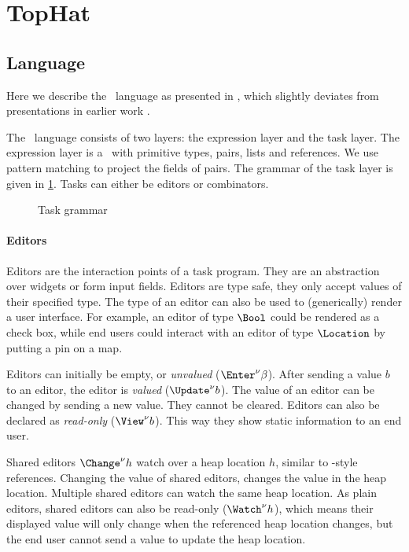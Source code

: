 
\section{TopHat}
\label{sec:tophat}

\subsection{Language}

Here we describe the \TOPHAT\ language as presented in \citet{Steenvoorden22},
which slightly deviates from presentations in earlier work \cite{conf/ppdp/SteenvoordenNK19,conf/ifl/NausSK19,conf/sfp/NausS20}.

The \TOPHAT\ language consists of two layers: the expression layer and the task layer.
The expression layer is a \STLC\ with primitive types, pairs, lists and references.
We use pattern matching to project the fields of pairs.
%
The grammar of the task layer is given in \cref{fig:task-grammar}.
Tasks can either be editors or combinators.

\begin{figure}[h]
  \caption{Task grammar}
  \label{fig:task-grammar}
\end{figure}

\paragraph{Editors}

Editors are the interaction points of a task program.
They are an abstraction over widgets or form input fields.
Editors are type safe,
they only accept values of their specified type.
The type of an editor can also be used to (generically) render a user interface.
For example,
an editor of type $\Bool$ could be rendered as a check box,
while end users could interact with an editor of type $\Location$ by putting a pin on a map.

Editors can initially be empty, or \emph{unvalued} ($\Enter^\nu \beta$).
After sending a value $b$ to an editor, the editor is \emph{valued} ($\Update^\nu b$).
The value of an editor can be changed by sending a new value.
They cannot be cleared.
Editors can also be declared as \emph{read-only} ($\View^\nu b$).
This way they show static information to an end user.

Shared editors $\Change^\nu h$ watch over a heap location $h$,
similar to \ML-style references.
Changing the value of shared editors,
changes the value in the heap location.
Multiple shared editors can watch the same heap location.
As plain editors, shared editors can also be read-only ($\Watch^\nu h$),
which means their displayed value will only change when the referenced heap location changes,
but the end user cannot send a value to update the heap location.

